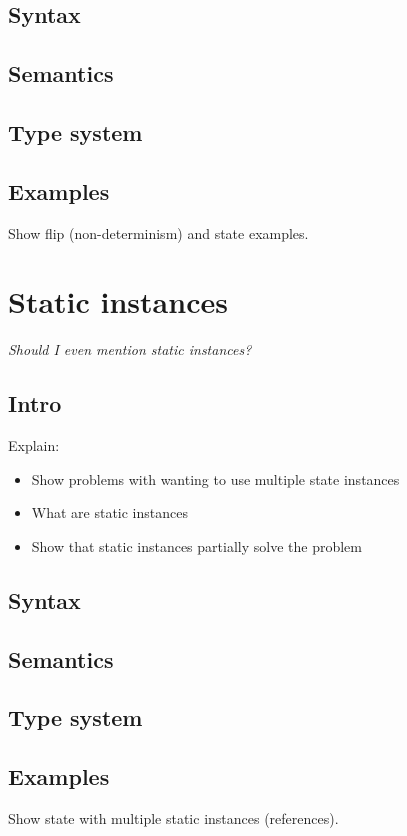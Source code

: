 {\subsection{Syntax}

\subsection{Semantics}

\subsection{Type system}

\subsection{Examples}
Show flip (non-determinism) and state examples.

\newpage
\section{Static instances}

\textit{Should I even mention static instances?}

\subsection{Intro}
Explain:
\begin{itemize}
	\item Show problems with wanting to use multiple state instances
	\item What are static instances
	\item Show that static instances partially solve the problem
\end{itemize}

\subsection{Syntax}

\subsection{Semantics}

\subsection{Type system}

\subsection{Examples}
Show state with multiple static instances (references).

}
